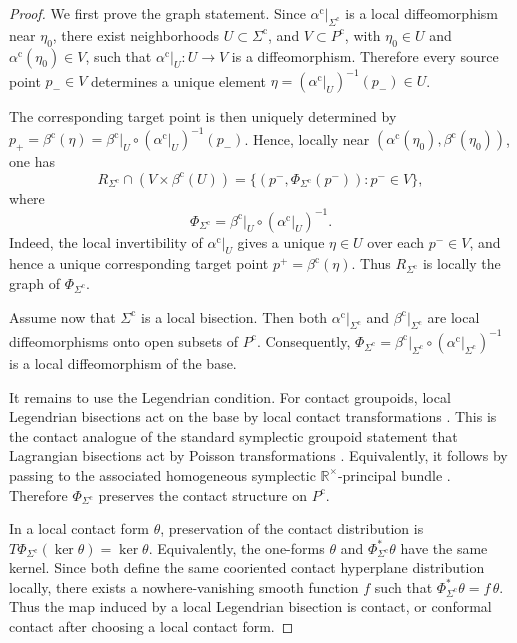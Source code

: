 \documentclass[11pt]{article}
\newcommand{\Rtimes}{\mathbb{R}^{\times}}
\begin{document}
\begin{proof}
We first prove the graph statement. Since
\(\alpha^{\mathrm c}|_{\Sigma^{\mathrm c}}\) is a local diffeomorphism near
\(\eta_0\), there exist neighborhoods $U\subset\Sigma^{\mathrm c}$, and $V\subset P^{\mathrm c}$, with \(\eta_0\in U\) and \(\alpha^{\mathrm c}(\eta_0)\in V\), such that
$\alpha^{\mathrm c}|_U:U\rightarrow V$ is a diffeomorphism. Therefore every source point \(p_-\in V\) determines a
unique element $\eta
=
\left(\alpha^{\mathrm c}|_U\right)^{-1}(p_-)
\in U$.

The corresponding target point is then uniquely determined by
$p_+
=
\beta^{\mathrm c}(\eta)
=
\beta^{\mathrm c}|_U
\circ
\left(\alpha^{\mathrm c}|_U\right)^{-1}(p_-)$. Hence, locally near \((\alpha^{\mathrm c}(\eta_0),\beta^{\mathrm c}(\eta_0))\), one has
\[
R_{\Sigma^{\mathrm c}}\cap (V\times \beta^{\mathrm c}(U))
=
\{(p^-,\Phi_{\Sigma^{\mathrm c}}(p^-)):p^-\in V\},
\]
where
\[
\Phi_{\Sigma^{\mathrm c}}
=
\beta^{\mathrm c}|_U\circ(\alpha^{\mathrm c}|_U)^{-1}.
\]
Indeed, the local invertibility of \(\alpha^{\mathrm c}|_U\) gives a unique
\(\eta\in U\) over each \(p^-\in V\), and hence a unique corresponding
target point \(p^+=\beta^{\mathrm c}(\eta)\). Thus
\(R_{\Sigma^{\mathrm c}}\) is locally the graph of
\(\Phi_{\Sigma^{\mathrm c}}\).

Assume now that \(\Sigma^{\mathrm c}\) is a local bisection. Then both
\(\alpha^{\mathrm c}|_{\Sigma^{\mathrm c}}\) and
\(\beta^{\mathrm c}|_{\Sigma^{\mathrm c}}\) are local diffeomorphisms onto open
subsets of \(P^{\mathrm c}\). Consequently,
$\Phi_{\Sigma^{\mathrm c}}
=
\beta^{\mathrm c}|_{\Sigma^{\mathrm c}}
\circ
\left(\alpha^{\mathrm c}|_{\Sigma^{\mathrm c}}\right)^{-1}$
is a local diffeomorphism of the base.

It remains to use the Legendrian condition. For contact groupoids, local
Legendrian bisections act on the base by local contact transformations
\cite{IglesiasMarrero2003,CrainicZhu2007}. This is the contact analogue of the
standard symplectic groupoid statement that Lagrangian bisections act by
Poisson transformations \cite{MarreroMartinDeDiegoStern2015}. Equivalently,
it follows by passing to the associated homogeneous symplectic
\(\Rtimes\)-principal bundle \cite{BGG2017}. Therefore
\(\Phi_{\Sigma^{\mathrm c}}\) preserves the contact structure on
\(P^{\mathrm c}\).

In a local contact form \(\theta\), preservation of the contact distribution is $T\Phi_{\Sigma^{\mathrm c}}(\ker\theta)=\ker\theta$. Equivalently, the one-forms \(\theta\) and
\(\Phi_{\Sigma^{\mathrm c}}^*\theta\) have the same kernel. Since both define
the same cooriented contact hyperplane distribution locally, there exists a
nowhere-vanishing smooth function \(f\) such that
$\Phi_{\Sigma^{\mathrm c}}^*\theta=f\,\theta$. Thus the map induced by a local Legendrian bisection is contact, or conformal
contact after choosing a local contact form.
\end{proof}
\end{document}
